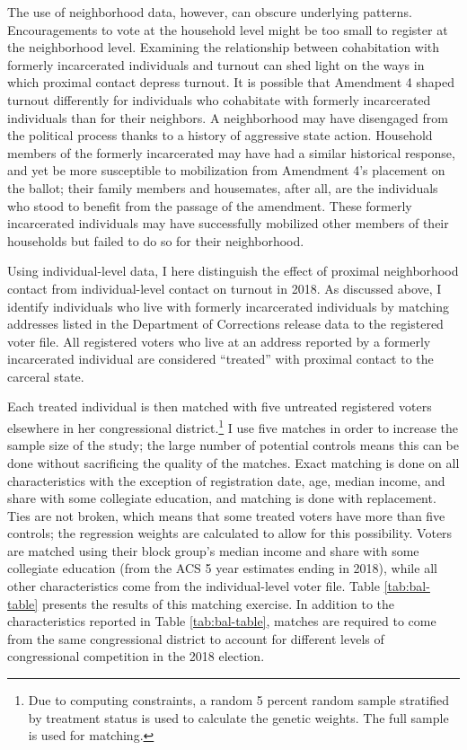 \documentclass[
  12pt,
]{article}
\begin{document}
The use of neighborhood data, however, can obscure underlying patterns. Encouragements to vote at the household level might be too small to register at the neighborhood level. Examining the relationship between cohabitation with formerly incarcerated individuals and turnout can shed light on the ways in which proximal contact depress turnout. It is possible that Amendment 4 shaped turnout differently for individuals who cohabitate with formerly incarcerated individuals than for their neighbors. A neighborhood may have disengaged from the political process thanks to a history of aggressive state action. Household members of the formerly incarcerated may have had a similar historical response, and yet be more susceptible to mobilization from Amendment 4's placement on the ballot; their family members and housemates, after all, are the individuals who stood to benefit from the passage of the amendment. These formerly incarcerated individuals may have successfully mobilized other members of their households but failed to do so for their neighborhood.

Using individual-level data, I here distinguish the effect of proximal neighborhood contact from individual-level contact on turnout in 2018. As discussed above, I identify individuals who live with formerly incarcerated individuals by matching addresses listed in the Department of Corrections release data to the registered voter file. All registered voters who live at an address reported by a formerly incarcerated individual are considered ``treated'' with proximal contact to the carceral state.

Each treated individual is then matched with five untreated registered voters elsewhere in her congressional district.\footnote{Due to computing constraints, a random 5 percent random sample stratified by treatment status is used to calculate the genetic weights. The full sample is used for matching.} I use five matches in order to increase the sample size of the study; the large number of potential controls means this can be done without sacrificing the quality of the matches. Exact matching is done on all characteristics with the exception of registration date, age, median income, and share with some collegiate education, and matching is done with replacement. Ties are not broken, which means that some treated voters have more than five controls; the regression weights are calculated to allow for this possibility. Voters are matched using their block group's median income and share with some collegiate education (from the ACS 5 year estimates ending in 2018), while all other characteristics come from the individual-level voter file. Table \ref{tab:bal-table} presents the results of this matching exercise. In addition to the characteristics reported in Table \ref{tab:bal-table}, matches are required to come from the same congressional district to account for different levels of congressional competition in the 2018 election.
\end{document}
